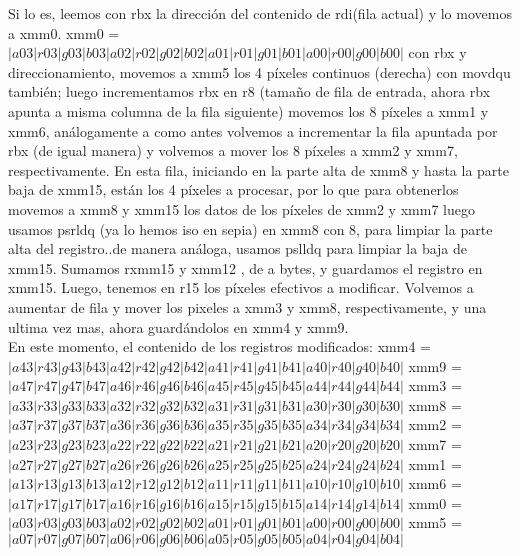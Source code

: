 \documentclass[a4paper]{article}
\begin{document}
        Si lo es, leemos con rbx la dirección del contenido de rdi(fila actual) y lo movemos a xmm0.    
        \hfill \break
         xmm0 = $|a03|r03|g03|b03|a02|r02|g02|b02|a01|r01|g01|b01|a00|r00|g00|b00| $
         \hfill \break
 con rbx y direccionamiento,    movemos a xmm5 los 4 píxeles continuos (derecha) con movdqu también;
 luego incrementamos rbx en r8 (tamaño de fila de entrada, ahora rbx apunta a misma columna de la fila siguiente)
 movemos los 8 píxeles a xmm1 y xmm6, análogamente a como antes
 volvemos a incrementar la fila apuntada por rbx (de igual manera)
 y volvemos a mover los 8 píxeles a xmm2 y xmm7, respectivamente.
 \hfill \break
 En esta fila, iniciando en la parte alta de xmm8 y hasta la parte baja de xmm15,  están los 4 píxeles a procesar, por lo que para obtenerlos movemos a xmm8 y xmm15 los datos de los píxeles de xmm2 y xmm7
 luego usamos psrldq (ya lo hemos iso en sepia) en xmm8 con 8, para limpiar la parte alta del registro..de manera análoga, usamos pslldq para limpiar la baja de xmm15. Sumamos rxmm15 y xmm12 , de a bytes, y guardamos el registro en xmm15. 
 Luego, tenemos en r15 los píxeles efectivos a modificar. 
 \hfill \break
 Volvemos a aumentar de fila y mover los pixeles a xmm3 y xmm8, respectivamente, y una ultima vez mas, ahora guardándolos en xmm4 y xmm9.
 \hfill \break
 \\
En este momento, el contenido de los registros modificados:
\hfill \break
xmm4 = $|a43|r43|g43|b43|a42|r42|g42|b42|a41|r41|g41|b41|a40|r40|g40|b40|$
\hfill \break
xmm9 = $|a47|r47|g47|b47|a46|r46|g46|b46|a45|r45|g45|b45|a44|r44|g44|b44|$
\hfill \break
xmm3 = $|a33|r33|g33|b33|a32|r32|g32|b32|a31|r31|g31|b31|a30|r30|g30|b30|$
\hfill \break
xmm8 = $|a37|r37|g37|b37|a36|r36|g36|b36|a35|r35|g35|b35|a34|r34|g34|b34|$
\hfill \break
xmm2 = $|a23|r23|g23|b23|a22|r22|g22|b22|a21|r21|g21|b21|a20|r20|g20|b20|$
\hfill \break
xmm7 = $|a27|r27|g27|b27|a26|r26|g26|b26|a25|r25|g25|b25|a24|r24|g24|b24| $
\hfill \break
xmm1 =$ |a13|r13|g13|b13|a12|r12|g12|b12|a11|r11|g11|b11|a10|r10|g10|b10|$
\hfill \break
xmm6 = $|a17|r17|g17|b17|a16|r16|g16|b16|a15|r15|g15|b15|a14|r14|g14|b14|$
\hfill \break
xmm0 =$ |a03|r03|g03|b03|a02|r02|g02|b02|a01|r01|g01|b01|a00|r00|g00|b00|$ 
\hfill \break
xmm5 =$ |a07|r07|g07|b07|a06|r06|g06|b06|a05|r05|g05|b05|a04|r04|g04|b04|$
\hfill \break
 \\
 
\end{document}
